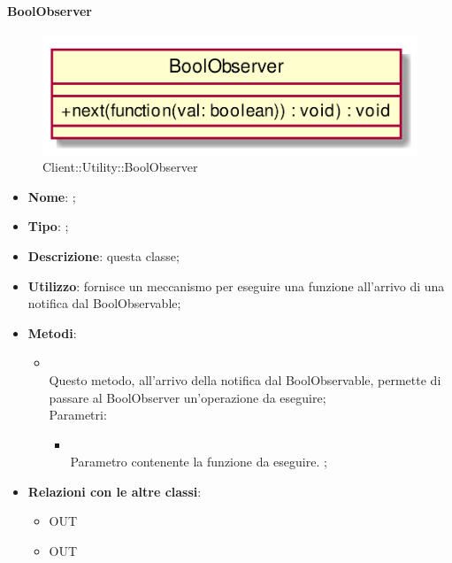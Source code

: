 \hypertarget{BoolObserver_label}{\paragraph{BoolObserver}}
\begin{figure}[h]
	\centering
	\includegraphics[width=\textwidth,height=\textheight,keepaspectratio]{images/ClassBoolObserver.png}
	\caption{Client::Utility::BoolObserver}
\end{figure}
\begin{itemize}
	\item \textbf{Nome}: ;
	\item \textbf{Tipo}: ;
	\item \textbf{Descrizione}: questa classe;
	\item \textbf{Utilizzo}: fornisce un meccanismo per eseguire una funzione all'arrivo di una notifica dal BoolObservable;
	\item \textbf{Metodi}:
	\begin{itemize}
		\item[]  \\
		Questo metodo, all'arrivo della notifica dal BoolObservable, permette di passare al BoolObserver un'operazione da eseguire;\\
		Parametri:
		\begin{itemize}
			\item {} \\
			Parametro contenente la funzione da eseguire.
;
		\end{itemize}
	\end{itemize}
	\item \textbf{Relazioni con le altre classi}:
	\begin{itemize}
		\item OUT \hyperlink{Recorder_label}{}
		\item OUT \hyperlink{BoolObservable_label}{}
	\end{itemize}
\end{itemize}
\FloatBarrier

